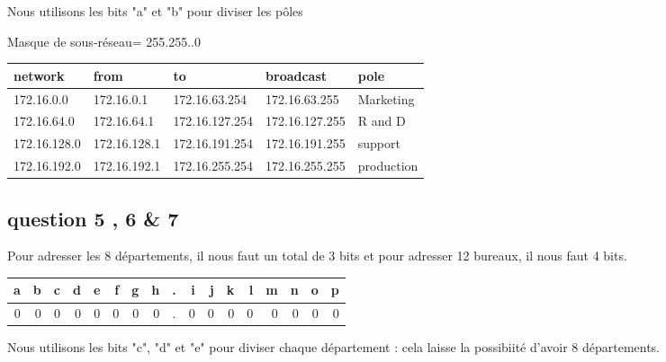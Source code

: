 \documentclass[11pt]{article}
\begin{document}
Nous utilisons les bits "a" et "b" pour diviser les pôles



Masque de sous-réseau= 255.255..0
\begin{center}
\begin{tabular}{|l|l|l|l|l|}
\hline
network & from & to & broadcast & pole \\
\hline
172.16.0.0 & 172.16.0.1 & 172.16.63.254 & 172.16.63.255 & Marketing \\
\hline
172.16.64.0 & 172.16.64.1 & 172.16.127.254 & 172.16.127.255 & R and D \\
\hline
172.16.128.0 & 172.16.128.1 & 172.16.191.254 & 172.16.191.255 & support \\
\hline
172.16.192.0 & 172.16.192.1 & 172.16.255.254 & 172.16.255.255 & production \\
\hline
\end{tabular}
\end{center}


\subsection{question 5 , 6 \& 7}
\label{sec:orgheadline13}

Pour adresser les 8 départements, il nous faut un total de 3 bits et pour adresser
12 bureaux, il nous faut 4 bits.


\begin{center}
\begin{tabular}{rrrrrrrrlrrrrrrrr}
a & b & c & d & e & f & g & h & . & i & j & k & l & m & n & o & p\\
\hline
0 & 0 & 0 & 0 & 0 & 0 & 0 & 0 & . & 0 & 0 & 0 & 0 & 0 & 0 & 0 & 0\\
\end{tabular}
\end{center}


Nous utilisons les bits "c", "d" et "e" pour diviser chaque département : cela laisse
la possibiité d'avoir 8 départements.
\end{document}
